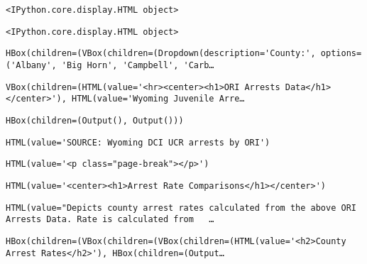 \documentclass[11pt]{article}
\begin{document}
    
    \begin{verbatim}
<IPython.core.display.HTML object>
    \end{verbatim}

    
    
    \begin{verbatim}
<IPython.core.display.HTML object>
    \end{verbatim}

    
    
    \begin{verbatim}
HBox(children=(VBox(children=(Dropdown(description='County:', options=('Albany', 'Big Horn', 'Campbell', 'Carb…
    \end{verbatim}

    
    
    \begin{verbatim}
VBox(children=(HTML(value='<hr><center><h1>ORI Arrests Data</h1></center>'), HTML(value='Wyoming Juvenile Arre…
    \end{verbatim}

    
    
    \begin{verbatim}
HBox(children=(Output(), Output()))
    \end{verbatim}

    
    
    \begin{verbatim}
HTML(value='SOURCE: Wyoming DCI UCR arrests by ORI')
    \end{verbatim}

    
    
    \begin{verbatim}
HTML(value='<p class="page-break"></p>')
    \end{verbatim}

    
    
    \begin{verbatim}
HTML(value='<center><h1>Arrest Rate Comparisons</h1></center>')
    \end{verbatim}

    
    
    \begin{verbatim}
HTML(value="Depicts county arrest rates calculated from the above ORI Arrests Data. Rate is calculated from   …
    \end{verbatim}

    
    
    \begin{verbatim}
HBox(children=(VBox(children=(VBox(children=(HTML(value='<h2>County Arrest Rates</h2>'), HBox(children=(Output…
    \end{verbatim}
\end{document}
